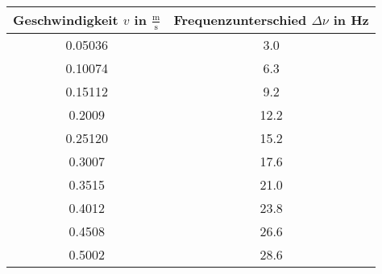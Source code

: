 \begin{center}
\begin{tabular}{c|c}
	Geschwindigkeit $v$ in $\frac{\text{m}}{\text{s}}$ & Frequenzunterschied $\Delta\nu$ in Hz\\
	\hline
	0.05036 & 3.0 \\
	0.10074 & 6.3 \\
	0.15112 & 9.2 \\
	0.2009 & 12.2 \\
	0.25120 & 15.2 \\
	0.3007 & 17.6 \\
	0.3515 & 21.0 \\
	0.4012 & 23.8 \\
	0.4508 & 26.6 \\
	0.5002 & 28.6 \\
\end{tabular}
\end{center}